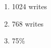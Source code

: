 \documentclass{article}
\begin{document}
\begin{enumerate}[label=\textbf{\Alph*.}]
\item 1024 writes
\item 768 writes
\item 75\%
\end{enumerate}
\end{document}
